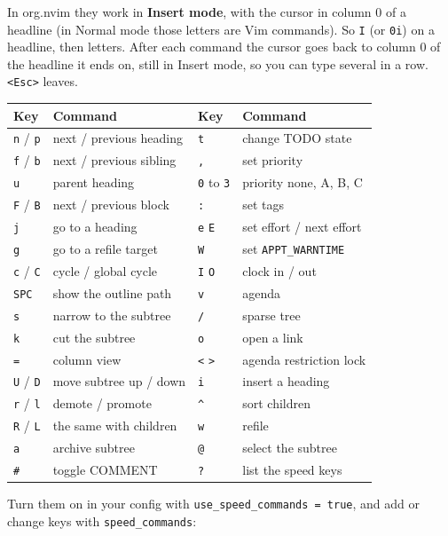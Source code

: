 In org.nvim they work in \textbf{Insert mode}, with the cursor in column 0 of a
headline (in Normal mode those letters are Vim commands). So \texttt{I} (or \texttt{0i})
on a headline, then letters. After each command the cursor goes back to
column 0 of the headline it ends on, still in Insert mode, so you can
type several in a row. \texttt{<Esc>} leaves.

\begin{center}
\begin{tabular}{llll}
Key & Command & Key & Command\\
\hline
\texttt{n} / \texttt{p} & next / previous heading & \texttt{t} & change TODO state\\
\texttt{f} / \texttt{b} & next / previous sibling & \texttt{,} & set priority\\
\texttt{u} & parent heading & \texttt{0} to \texttt{3} & priority none, A, B, C\\
\texttt{F} / \texttt{B} & next / previous block & \texttt{:} & set tags\\
\texttt{j} & go to a heading & \texttt{e} \texttt{E} & set effort / next effort\\
\texttt{g} & go to a refile target & \texttt{W} & set \texttt{APPT\_WARNTIME}\\
\texttt{c} / \texttt{C} & cycle / global cycle & \texttt{I} \texttt{O} & clock in / out\\
\texttt{SPC} & show the outline path & \texttt{v} & agenda\\
\texttt{s} & narrow to the subtree & \texttt{/} & sparse tree\\
\texttt{k} & cut the subtree & \texttt{o} & open a link\\
\texttt{=} & column view & \texttt{<} \texttt{>} & agenda restriction lock\\
\texttt{U} / \texttt{D} & move subtree up / down & \texttt{i} & insert a heading\\
\texttt{r} / \texttt{l} & demote / promote & \texttt{\textasciicircum{}} & sort children\\
\texttt{R} / \texttt{L} & the same with children & \texttt{w} & refile\\
\texttt{a} & archive subtree & \texttt{@} & select the subtree\\
\texttt{\#} & toggle COMMENT & \texttt{?} & list the speed keys\\
\end{tabular}
\end{center}

Turn them on in your config with \texttt{use\_speed\_commands = true}, and add or
change keys with \texttt{speed\_commands}:

